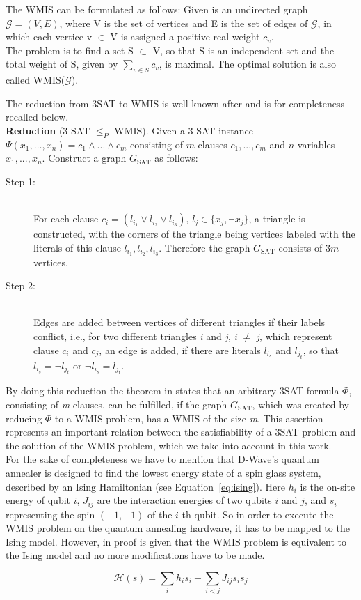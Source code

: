 The WMIS can be formulated as follows: Given is an undirected graph $\mathcal{G} = (V, E)$, where V is the set of vertices and E is the set of edges of $\mathcal{G}$, in which each vertice v $\in$ V is assigned a positive real weight $c_{v}$.\\
The problem is to find a set S $\subset$ V, so that S is an independent set and the total weight of S, given by $\sum_{v \in S} c_{v}$, is maximal. The optimal solution is also called WMIS($\mathcal{G}$).

The reduction from 3SAT to WMIS is well known after \cite{choi2010adiabatic} and is for completeness recalled below.\\

\textbf{Reduction} (3-SAT $\leq_ {P}$ WMIS).
Given a 3-SAT instance $\Psi(x_{1}, \dots, x_{n}) = c_{1} \wedge ... \wedge c_{m}$ consisting of $m$ clauses \emph{$c_{1}, ..., c_{m}$} and $n$ variables $x_1, ..., x_n$. Construct a graph $G_{\text{SAT}}$ as follows:
\begin{description}
	\item[Step 1:]\hfill \\
	For each clause $c_{i} = (l_{i_{1}} \vee l_{i_{2}} \vee l_{i_{3}})$, $l_{j} \in \{x_{j}, \lnot x_{j}\}$, a triangle is constructed, with the corners of the triangle being vertices labeled with the literals of this clause $l_{i_{1}}, l_{i_{2}}, l_{i_{3}}$. Therefore the graph $G_{\text{SAT}}$ consists of $3m$ vertices.
	\item[Step 2:]\hfill \\
	Edges are added between vertices of different triangles if their labels conflict, i.e., for two different triangles \emph{i} and \emph{j}, \emph{i} $\neq$ \emph{j}, which represent clause $c_i$ and $c_j$, an edge is added, if there are literals $l_{i_{s}}$ and $l_{j_{t}}$, so that $l_{i_{s}} = \lnot l_{j_{t}}$ or $\lnot l_{i_{s}} = l_{j_{t}}$.
\end{description}

By doing this reduction the theorem in \cite{choi2010adiabatic} states that an arbitrary 3SAT formula $\Phi$, consisting of \emph{m} clauses, can be fulfilled, if the graph $G_{\text{SAT}}$, which was created by reducing $\Phi$ to a WMIS problem, has a WMIS of the size \emph{m}. 
This assertion represents an important relation between the satisfiability of a 3SAT problem and the solution of the WMIS problem, which we take into account in this work.\\

For the sake of completeness we have to mention that D-Wave's quantum annealer is designed to find the lowest energy state of a spin glass system, described by an Ising Hamiltonian (see Equation~\ref{eq:ising}). Here $ h_{i}$ is the on-site energy of qubit $i$, $J_{ij}$ are the interaction energies of two qubits $i$ and $j$, and $s_{i}$ representing the spin $(-1, +1)$ of the $i$-th qubit. So in order to execute the WMIS problem on the quantum annealing hardware, it has to be mapped to the Ising model. However, in \cite{choi2008minor} proof is given that the WMIS problem is equivalent to the Ising model and no more modifications have to be made.

\begin{equation}\label{eq:ising}
	\mathcal{H}(s) = \sum_{i} h_{i}s_{i} + \sum_{i<j} J_{ij}s_{i}s_{j}
\end{equation}

